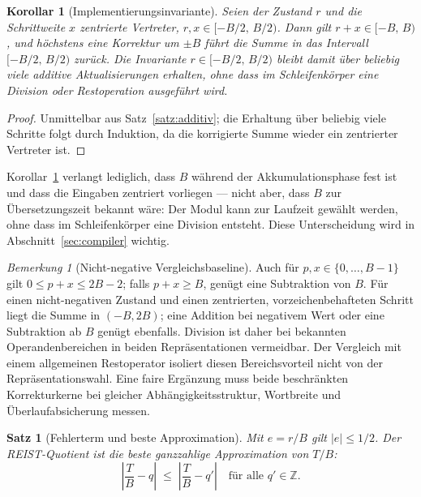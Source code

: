 \documentclass[11pt,a4paper]{scrartcl}
\theoremstyle{definition}
\theoremstyle{plain}
\newtheorem{satz}[definition]{Satz}
\newtheorem{korollar}[definition]{Korollar}
\theoremstyle{remark}
\newtheorem{bemerkung}[definition]{Bemerkung}
\newcommand{\Z}{\mathbb{Z}}
\begin{document}
\begin{korollar}[Implementierungsinvariante]
\label{kor:invariante}
Seien der Zustand $r$ und die Schrittweite $x$ zentrierte Vertreter, $r, x \in [-B/2,\, B/2)$. Dann gilt $r + x \in [-B,\, B)$, und höchstens eine Korrektur um $\pm B$ führt die Summe in das Intervall $[-B/2,\, B/2)$ zurück. Die Invariante $r \in [-B/2,\, B/2)$ bleibt damit über beliebig viele additive Aktualisierungen erhalten, ohne dass im Schleifenkörper eine Division oder Restoperation ausgeführt wird.
\end{korollar}

\begin{proof}
Unmittelbar aus Satz~\ref{satz:additiv}; die Erhaltung über beliebig viele Schritte folgt durch Induktion, da die korrigierte Summe wieder ein zentrierter Vertreter ist.
\end{proof}

Korollar~\ref{kor:invariante} verlangt lediglich, dass $B$ während der Akkumulationsphase fest ist und dass die Eingaben zentriert vorliegen --- nicht aber, dass $B$ zur Übersetzungszeit bekannt wäre: Der Modul kann zur Laufzeit gewählt werden, ohne dass im Schleifenkörper eine Division entsteht. Diese Unterscheidung wird in Abschnitt~\ref{sec:compiler} wichtig.

\begin{bemerkung}[Nicht-negative Vergleichsbaseline]
Auch für $p,x\in\{0,\ldots,B-1\}$ gilt $0\le p+x\le2B-2$; falls $p+x\ge B$, genügt eine Subtraktion von $B$. Für einen nicht-negativen Zustand und einen zentrierten, vorzeichenbehafteten Schritt liegt die Summe in $(-B,2B)$; eine Addition bei negativem Wert oder eine Subtraktion ab $B$ genügt ebenfalls. Division ist daher bei bekannten Operandenbereichen in beiden Repräsentationen vermeidbar. Der Vergleich mit einem allgemeinen Restoperator isoliert diesen Bereichsvorteil nicht von der Repräsentationswahl. Eine faire Ergänzung muss beide beschränkten Korrekturkerne bei gleicher Abhängigkeitsstruktur, Wortbreite und Überlaufabsicherung messen.
\end{bemerkung}

\begin{satz}[Fehlerterm und beste Approximation]
\label{satz:fehler}
Mit $e = r/B$ gilt $|e| \le 1/2$. Der REIST-Quotient ist die beste ganzzahlige Approximation von $T/B$:
\begin{equation}
\left| \frac{T}{B} - q \right| \;\le\; \left| \frac{T}{B} - q' \right| \quad \text{für alle } q' \in \Z.
\end{equation}
\end{satz}
\end{document}
